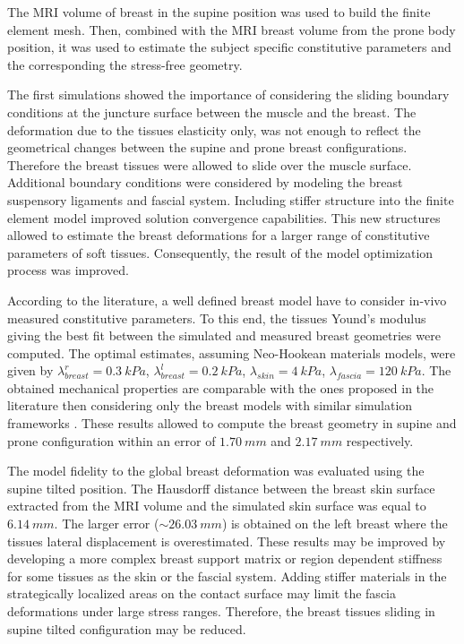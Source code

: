  The MRI volume of breast in the supine position was used to build the finite element mesh. Then, combined with the MRI breast volume from the prone body position, it was used to estimate the subject specific constitutive parameters and the corresponding the stress-free geometry. 
 
 The first simulations showed the importance of considering the sliding boundary conditions at the juncture surface between  the muscle and the breast. The deformation due to the tissues elasticity only, was not enough to reflect the geometrical changes between the supine and prone breast configurations. Therefore the breast tissues were allowed to slide over the muscle surface. Additional boundary conditions were considered by modeling the breast suspensory ligaments and fascial system. Including stiffer structure into the finite element model improved solution convergence capabilities. This new structures allowed to estimate the breast deformations for a larger range of constitutive parameters of soft tissues. Consequently, the result of the model optimization process was improved.   
 
 According to the literature, a well defined breast model have to consider in-vivo measured constitutive parameters. To this end, the tissues Yound's modulus giving the best fit between the simulated and measured breast geometries were computed. The optimal estimates, assuming Neo-Hookean materials models, were given by $\lambda_{breast}^r=0.3\ kPa$, $\lambda_{breast}^l=0.2\ kPa$, $\lambda_{skin}=4\ kPa$, $\lambda_{fascia}=120\ kPa$. The obtained mechanical properties are comparable with the ones proposed in the literature then considering only the breast models with similar simulation frameworks \cite{rajagopal_modelling_2007, gamage_modelling_2012, griesenauer_breast_2017}. These results allowed to compute the breast geometry in supine and prone configuration within an error of $1.70\ mm$ and $2.17\ mm$ respectively. 
 
The model fidelity to the global breast deformation was evaluated using the supine tilted position. The Hausdorff distance between the breast skin surface extracted from the MRI volume and the simulated skin surface was equal to $6.14 \ mm$. The larger error ($\sim 26.03 \ mm$) is obtained on the left breast where the tissues lateral displacement is overestimated. These results may be improved by developing a more complex breast support matrix or region dependent stiffness for some tissues as the skin or the fascial system. Adding stiffer materials in the strategically localized areas on the contact surface may limit the fascia deformations under large stress ranges. Therefore, the breast tissues sliding in supine tilted configuration may be reduced. 


